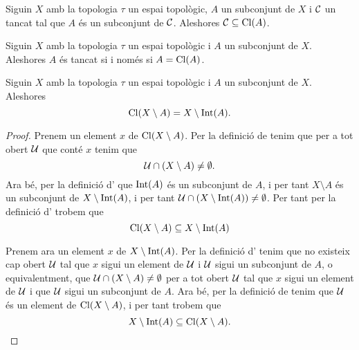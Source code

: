 \documentclass[../Apunts.tex]{subfiles}
\begin{document}
	\begin{corollary}
		\label{cor:la clausura d'un conjunt és el tancat més petit que el conté}
		Siguin \(X\) amb la topologia \(\tau\) un espai topològic, \(A\) un subconjunt de \(X\) i \(\mathcal{C}\) un tancat tal que \(A\) és un subconjunt de \(\mathcal{C}\). Aleshores \(\mathcal{C}\subseteq\operatorname{Cl}(A)\).
	\end{corollary}
	\begin{corollary}
		\label{cor:un conjunt és tancat si i només si és igual a la seva clausura}
		Siguin \(X\) amb la topologia \(\tau\) un espai topològic i \(A\) un subconjunt de \(X\). Aleshores \(A\) és tancat si i només si \(A=\operatorname{Cl}(A)\).
	\end{corollary}
	\begin{proposition}
		\label{prop:la clausura d'un conjunt és el complementari de l'interior del complementari del conjunt}
		Siguin \(X\) amb la topologia \(\tau\) un espai topològic i \(A\) un subconjunt de \(X\). Aleshores
		\[\operatorname{Cl}(X\setminus A)=X\setminus\operatorname{Int}(A).\]
		\begin{proof} %
			Prenem un element \(x\) de \(\operatorname{Cl}(X\setminus A)\). Per la definició de  tenim que per a tot obert \(\mathcal{U}\) que conté \(x\) tenim que
			\[\mathcal{U}\cap(X\setminus A)\neq\emptyset.\]
			Ara bé, per la definició d' que \(\operatorname{Int}(A)\) és un subconjunt de \(A\), i per tant \(X\setminus A\) és un subconjunt de \(X\setminus\operatorname{Int}(A)\), i per tant \(\mathcal{U}\cap(X\setminus\operatorname{Int}(A))\neq\emptyset\). Per tant per la definició d' trobem que
			\begin{equation}
				\label{prop:la clausura d'un conjunt és el complementari de l'interior del complementari del conjunt:eq1}
				\operatorname{Cl}(X\setminus A)\subseteq X\setminus\operatorname{Int}(A)
			\end{equation}
			
			Prenem ara un element \(x\) de \(X\setminus\operatorname{Int}(A)\). Per la definició d' tenim que no existeix cap obert \(\mathcal{U}\) tal que \(x\) sigui un element de \(\mathcal{U}\) i \(\mathcal{U}\) sigui un subconjunt de \(A\), o equivalentment, que \(\mathcal{U}\cap(X\setminus A)\neq\emptyset\) per a tot obert \(\mathcal{U}\) tal que \(x\) sigui un element de  \(\mathcal{U}\) i que \(\mathcal{U}\) sigui un subconjunt de \(A\). Ara bé, per la definició de  tenim que \(\mathcal{U}\) és un element de \(\operatorname{Cl}(X\setminus A)\), i per tant trobem que
			\begin{equation}
				\label{prop:la clausura d'un conjunt és el complementari de l'interior del complementari del conjunt:eq2}
				X\setminus\operatorname{Int}(A)\subseteq\operatorname{Cl}(X\setminus A).
			\end{equation}
			

\end{proof}
\end{proposition}
\end{document}
